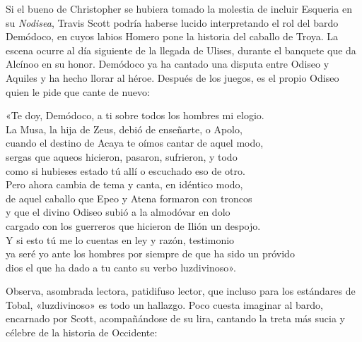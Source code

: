 \label{cap:bardos}

Si el bueno de Christopher se hubiera tomado la molestia de incluir Esqueria en su \emph{Nodisea}, Travis Scott podría haberse lucido interpretando el rol del bardo Demódoco, en cuyos labios Homero pone la historia del caballo de Troya. La escena ocurre al día siguiente de la llegada de Ulises, durante el banquete que da Alcínoo en su honor. Demódoco ya ha cantado una disputa entre Odiseo y Aquiles y ha hecho llorar al héroe. Después de los juegos, es el propio Odiseo quien le pide que cante de nuevo:

\begin{versocita}
«Te doy, Demódoco, a ti sobre todos los hombres mi elogio.\\
La Musa, la hija de Zeus, debió de enseñarte, o Apolo,\\
cuando el destino de Acaya te oímos cantar de aquel modo,\\
sergas que aqueos hicieron, pasaron, sufrieron, y todo\\
como si hubieses estado tú allí o escuchado eso de otro.\\
Pero ahora cambia de tema y canta, en idéntico modo,\\
de aquel caballo que Epeo y Atena formaron con troncos\\
y que el divino Odiseo subió a la almodóvar en dolo\\
cargado con los guerreros que hicieron de Ilión un despojo.\\
Y si esto tú me lo cuentas en ley y razón, testimonio\\
ya seré yo ante los hombres por siempre de que ha sido un próvido\\
dios el que ha dado a tu canto su verbo luzdivinoso».
\end{versocita}

Observa, asombrada lectora, patidifuso lector, que incluso para los estándares de Tobal, «luzdivinoso» es todo un hallazgo. Poco cuesta imaginar al bardo, encarnado por Scott, acompañándose de su lira, cantando la treta más sucia y célebre de la historia de Occidente:

